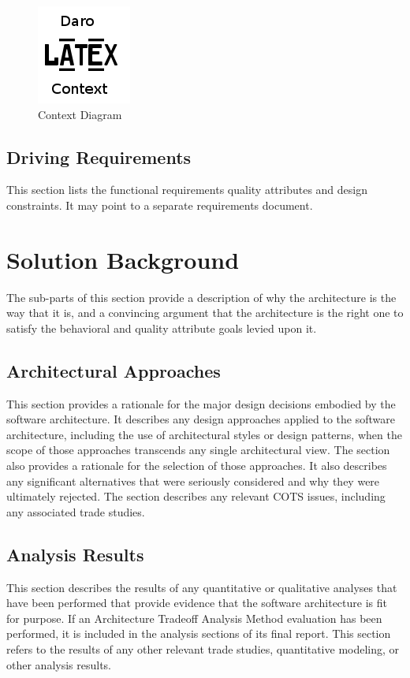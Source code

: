 \documentclass[a4paper,11pt]{book}
\begin{document}
\begin{figure}[h] %
  \includegraphics{image_001}
  \caption{Context Diagram}
  \centering
  \label{fig:context} %
\end{figure}

\subsection{Driving Requirements}
This section lists the functional requirements quality attributes and design constraints. It may point to a separate requirements document.

\section{Solution Background}
The sub-parts of this section provide a description of why the architecture is the way that it is, and a convincing argument that the architecture is the right one to satisfy the behavioral and quality attribute goals levied upon it.

\subsection{Architectural Approaches}
This section provides a rationale for the major design decisions embodied by the software architecture. It describes any design approaches applied to the software architecture, including the use of architectural styles or design patterns, when the scope of those approaches transcends any single architectural view. The section also provides a rationale for the selection of those approaches. It also describes any significant alternatives that were seriously considered and why they were ultimately rejected. The section describes any relevant COTS issues, including any associated trade studies.

\subsection{Analysis Results}
This section describes the results of any quantitative or qualitative analyses that have been performed that provide evidence that the software architecture is fit for purpose. If an Architecture Tradeoff Analysis Method evaluation has been performed, it is included in the analysis sections of its final report. This section refers to the results of any other relevant trade studies, quantitative modeling, or other analysis results.
\end{document}
